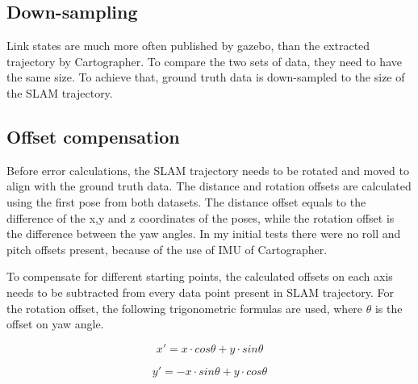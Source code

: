 \subsection{Down-sampling}
Link states are much more often published by gazebo, than the extracted trajectory by Cartographer. 
To compare the two sets of data, they need to have the same size. To achieve that, ground truth
data is down-sampled to the size of the SLAM trajectory.

\subsection{Offset compensation}
Before error calculations, the SLAM trajectory needs to be rotated and moved to align with the
ground truth data. The distance and rotation offsets are calculated using the first pose from both
datasets. The distance offset equals to the difference of the x,y and z coordinates of the poses,
while the rotation offset is the difference between the yaw angles. In my initial tests there were 
no roll and pitch offsets present, because of the use of IMU of Cartographer. 

To compensate for different starting points, the calculated offsets on each axis needs to be 
subtracted from every data point present in SLAM trajectory. For the rotation offset, the 
following trigonometric formulas are used, where $\theta$ is the offset on yaw angle.

\begin{equation}\label{eq:rotation_x}
    x'=x\cdot cos\theta + y\cdot sin\theta    
\end{equation}

\begin{equation}\label{eq:rotation_y}
    y'=-x\cdot sin\theta + y \cdot cos\theta
\end{equation}


